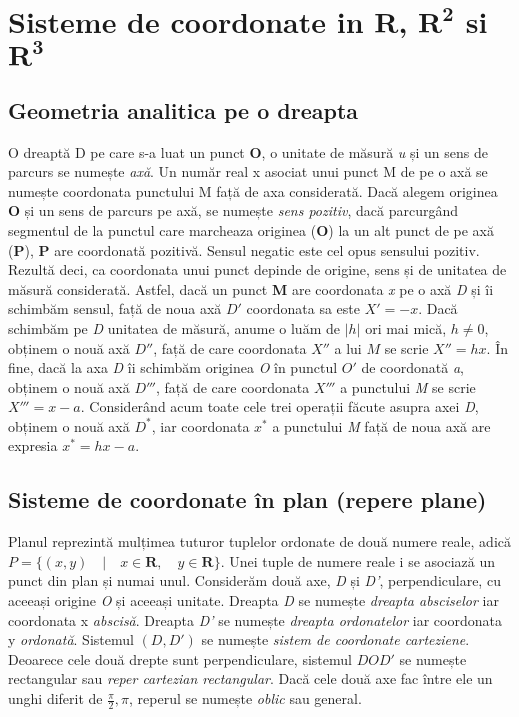 \section{Sisteme de coordonate in $\mathbf{R}$, $\mathbf{R^2}$ si
$\mathbf{R^3}$}
\label{ch1:sec_coord_sys}

\subsection{Geometria analitica pe o dreapta}
\label{ch1:sec_coord_sys:geometrie_dreapta}
\indent

O dreaptă D pe care s-a luat un punct \textbf{O}, o unitate de măsură \textit{u}
și un sens de parcurs se numește \emph{axă}. Un număr real x asociat unui punct 
M de pe o axă se numește coordonata punctului M față de axa considerată. Dacă
alegem originea \textbf{O} și un sens de parcurs pe axă, se numește \textit{sens
pozitiv}, dacă parcurgând segmentul de la punctul care marcheaza originea
(\textbf{O}) la un alt punct de pe axă (\textbf{P}), \textbf{P} are coordonată
pozitivă. Sensul negatic este cel opus sensului pozitiv. Rezultă deci, ca
coordonata unui punct depinde de origine, sens și de unitatea de măsură
considerată.
Astfel, dacă un punct \textbf{M} are coordonata \textit{x} pe o axă
\textit{D} și îi schimbăm sensul, față de noua axă $\mathit{D'}$ coordonata sa
este $\mathit{X' = -x}$. Dacă schimbăm pe \textit{D} unitatea de măsură, anume o
luăm de $\mathit{|h|}$ ori mai mică, $\mathit{h \neq 0}$, obținem o nouă axă
$\mathit{D''}$, față de care coordonata $\mathit{X''}$ a lui $\mathit{M}$
se scrie $\mathit{X'' = hx}$. În fine, dacă la axa \textit{D} îi schimbăm
originea \textit{O} în punctul $\mathit{O'}$ de coordonată \textit{a}, obținem o
nouă axă $\mathit{D'''}$, față de care coordonata $\mathit{X'''}$ a punctului
\textit{M} se scrie $\mathit{X''' = x - a}$. Considerând acum toate cele trei
operații făcute asupra axei \textit{D}, obținem o nouă axă $\mathit{D^*}$, iar
coordonata $\mathit{x^*}$ a punctului \textit{M} față de noua axă are expresia
$\mathit{x^* = hx - a}$.

\subsection{Sisteme de coordonate în plan (repere plane)}
\label{ch1:sec_coord_sys:cartesian_plane}
\indent

Planul reprezintă mulțimea tuturor tuplelor ordonate de două numere reale, adică
$P = \lbrace (x, y) \quad \vert \quad x \in \mathbf{R}, \quad y \in \mathbf{R}
\rbrace $. Unei tuple de numere reale i se asociază un punct din plan și numai
unul. Considerăm două axe, \textit{D} și \textit{D'}, perpendiculare, cu aceeași
origine \textit{O} și aceeași unitate. Dreapta \textit{D} se numește
\textit{dreapta absciselor} iar coordonata x \textit{abscisă}. Dreapta
\textit{D'} se numește \textit{dreapta ordonatelor} iar coordonata y
\textit{ordonată}. Sistemul $(D, D')$ se numește \textit{sistem de coordonate
carteziene}. Deoarece cele două drepte sunt perpendiculare, sistemul
$\mathit{DOD'}$ se numește rectangular sau \textit{reper cartezian rectangular}.
Dacă cele două axe fac  între ele un unghi diferit de $\frac{\pi}{2}, \pi$,
reperul se numește \textit{oblic} sau general. 

